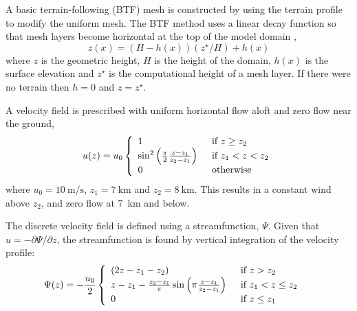 A basic terrain-following (BTF) mesh is constructed by using the terrain profile to modify the uniform mesh.
The BTF method uses a linear decay function so that mesh layers become horizontal at the top of the model domain \citep{galchen-somerville1975a},
\begin{equation}
	z(x) = \left( H - h(x) \right) \left( z^\star / H \right) + h(x) \label{eqn:btf}
\end{equation}
where $z$ is the geometric height, $H$ is the height of the domain, $h(x)$ is the surface elevation and $z^\star$ is the computational height of a mesh layer.  If there were no terrain then $h = 0$ and $z = z^\star$.

A velocity field is prescribed with uniform horizontal flow aloft and zero flow near the ground,
\begin{align}
	u(z) = u_0 \left\{ \begin{array}{l l}
		1 & \enskip \text{if $z \geq z_2$} \\
		\sin^2 \left( \frac{\pi}{2} \frac{z - z_1}{z_2 - z_1} \right) & \enskip \text{if $z_1 < z < z_2$} \\
		0 & \enskip \text{otherwise}
	\end{array} \right.	
\end{align}
where $u_0 = \SI{10}{\meter\per\second}$, $z_1 = \SI{7}{\kilo\meter}$ and $z_2 = \SI{8}{\kilo\meter}$.
This results in a constant wind above $z_2$, and zero flow at \SI{7}{\kilo\meter} and below.

The discrete velocity field is defined using a streamfunction, \(\Psi\).  Given that \(u = -\partial \Psi / \partial z\), the streamfunction is found by vertical integration of the velocity profile:
\begin{align}
	\Psi(z) &= -\frac{u_0}{2} \left\{ \begin{array}{l l}
		\left( 2z - z_1 - z_2 \right) & \enskip \text{if $z > z_2$} \\
		z - z_1 - \frac{z_2 - z_1}{\pi} \sin \left(\pi \frac{z - z_1}{z_2-z_1}\right) & \enskip \text{if $z_1 < z \leq z_2$} \\
		0 & \enskip \text{if $z \leq z_1$}
	\end{array} \right.
\end{align}

